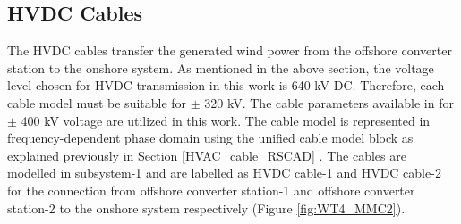 \subsection{\gls{HVDC} Cables}
The \gls{HVDC} cables transfer the generated wind power from the offshore converter station to the onshore system. As mentioned in the above section, the voltage level chosen for \gls{HVDC} transmission in this work is 640 kV \gls{DC}. Therefore, each cable model must be suitable for $\pm$ 320 kV. The cable parameters available in \cite{vrana2013cigre} for $\pm$ 400 kV voltage are utilized in this work. The cable model is represented in frequency-dependent phase domain using the unified cable model block as explained previously in Section \ref{HVAC_cable_RSCAD} \cite{rtds_tech}. The cables are modelled in subsystem-1 and are labelled as \gls{HVDC} cable-1 and \gls{HVDC} cable-2 for the connection from offshore converter station-1 and offshore converter station-2 to the onshore system  respectively (Figure \ref{fig:WT4_MMC2}). 

